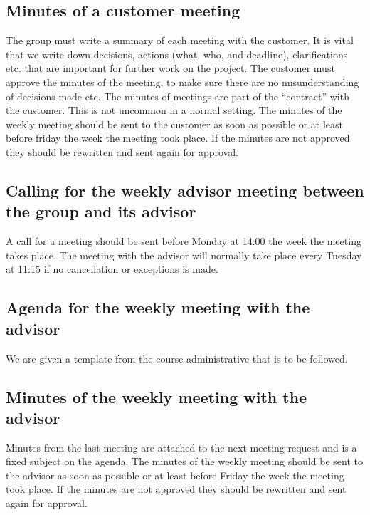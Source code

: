 \subsection{Minutes of a customer meeting}
The group must write a summary of each meeting with the customer. It is vital that we write down decisions, actions (what, who, and deadline), clarifications etc. that are important for further work on the project. The customer must approve the minutes of the meeting, to make sure there are no misunderstanding of decisions made etc. The minutes of meetings are part of the “contract” with the customer. This is not uncommon in a normal setting.
\newline
\newline
The minutes of the weekly meeting should be sent to the customer as soon as possible or at least before friday the week the meeting took place. If the minutes are not approved they should be rewritten and sent again for approval. 

\subsection{Calling for the weekly advisor meeting between the group and its advisor}
A call for a meeting should be sent before Monday at 14:00 the week the meeting takes place. The meeting with the advisor will normally take place every Tuesday at 11:15 if no cancellation or exceptions is made.

\subsection{Agenda for the weekly meeting with the advisor}
We are given a template from the course administrative that is to be followed.

\subsection{Minutes of the weekly meeting with the advisor}
Minutes from the last meeting are attached to the next meeting request and is a fixed subject on the agenda.
\newline
\newline
The minutes of the weekly meeting should be sent to the advisor as soon as possible or at least before Friday the week the meeting took place. If the minutes are not approved they should be rewritten and sent again for approval. 


